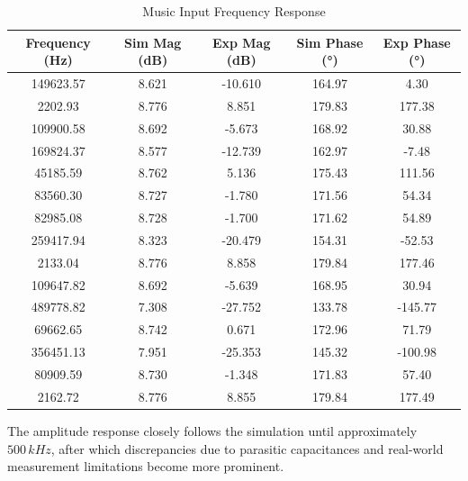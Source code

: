 \documentclass[12pt]{article}
\begin{document}
\begin{table}[H]
	\centering
	\caption{Music Input Frequency Response}
	\renewcommand{\arraystretch}{1.3}
	\begin{tabular}{|c|c|c|c|c|}
		\hline
		\textbf{Frequency (Hz)} & \textbf{Sim Mag (dB)} & \textbf{Exp Mag (dB)} & \textbf{Sim Phase (°)} & \textbf{Exp Phase (°)} \\ \hline
		149623.57               & 8.621                 & -10.610               & 164.97                 & 4.30                   \\ \hline
		2202.93                 & 8.776                 & 8.851                 & 179.83                 & 177.38                 \\ \hline
		109900.58               & 8.692                 & -5.673                & 168.92                 & 30.88                  \\ \hline
		169824.37               & 8.577                 & -12.739               & 162.97                 & -7.48                  \\ \hline
		45185.59                & 8.762                 & 5.136                 & 175.43                 & 111.56                 \\ \hline
		83560.30                & 8.727                 & -1.780                & 171.56                 & 54.34                  \\ \hline
		82985.08                & 8.728                 & -1.700                & 171.62                 & 54.89                  \\ \hline
		259417.94               & 8.323                 & -20.479               & 154.31                 & -52.53                 \\ \hline
		2133.04                 & 8.776                 & 8.858                 & 179.84                 & 177.46                 \\ \hline
		109647.82               & 8.692                 & -5.639                & 168.95                 & 30.94                  \\ \hline
		489778.82               & 7.308                 & -27.752               & 133.78                 & -145.77                \\ \hline
		69662.65                & 8.742                 & 0.671                 & 172.96                 & 71.79                  \\ \hline
		356451.13               & 7.951                 & -25.353               & 145.32                 & -100.98                \\ \hline
		80909.59                & 8.730                 & -1.348                & 171.83                 & 57.40                  \\ \hline
		2162.72                 & 8.776                 & 8.855                 & 179.84                 & 177.49                 \\ \hline
	\end{tabular}
	\label{tab:music_response}
\end{table}
The amplitude response closely follows the simulation until approximately $500\,kHz$, after which discrepancies due to parasitic capacitances and real-world measurement limitations become more prominent.
\end{document}
